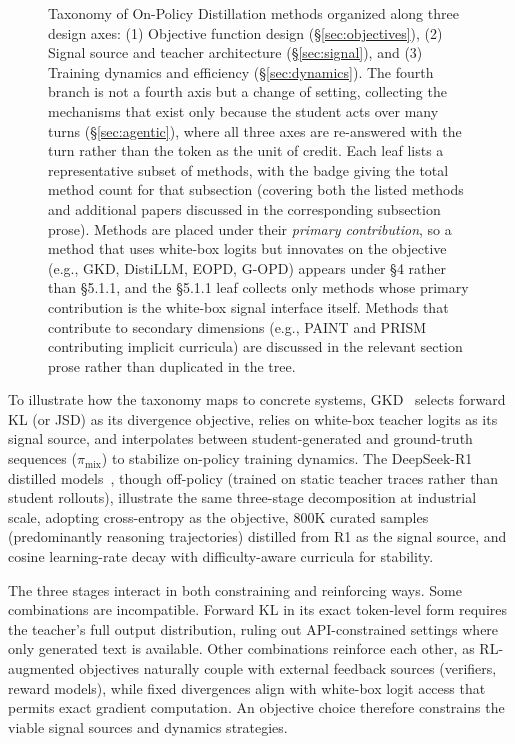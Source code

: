 \documentclass{article} %
\begin{document}
\begin{figure}[!htbp]
\caption{Taxonomy of On-Policy Distillation methods organized along three design axes: (1) Objective function design (\S\ref{sec:objectives}), (2) Signal source and teacher architecture (\S\ref{sec:signal}), and (3) Training dynamics and efficiency (\S\ref{sec:dynamics}). The fourth branch is not a fourth axis but a change of setting, collecting the mechanisms that exist only because the student acts over many turns (\S\ref{sec:agentic}), where all three axes are re-answered with the turn rather than the token as the unit of credit. Each leaf lists a representative subset of methods, with the badge giving the total method count for that subsection (covering both the listed methods and additional papers discussed in the corresponding subsection prose). Methods are placed under their \emph{primary contribution}, so a method that uses white-box logits but innovates on the objective (e.g., GKD, DistiLLM, EOPD, G-OPD) appears under \S 4 rather than \S 5.1.1, and the \S 5.1.1 leaf collects only methods whose primary contribution is the white-box signal interface itself. Methods that contribute to secondary dimensions (e.g., PAINT and PRISM contributing implicit curricula) are discussed in the relevant section prose rather than duplicated in the tree.}
\label{fig:taxonomy}
\end{figure}

To illustrate how the taxonomy maps to concrete systems, GKD~\citep{2306.13649} selects forward KL (or JSD) as its divergence objective, relies on white-box teacher logits as its signal source, and interpolates between student-generated and ground-truth sequences ($\pi_{\mathrm{mix}}$) to stabilize on-policy training dynamics. The DeepSeek-R1 distilled models~\citep{2501.12948}, though off-policy (trained on static teacher traces rather than student rollouts), illustrate the same three-stage decomposition at industrial scale, adopting cross-entropy as the objective, 800K curated samples (predominantly reasoning trajectories) distilled from R1 as the signal source, and cosine learning-rate decay with difficulty-aware curricula for stability.

The three stages interact in both constraining and reinforcing ways. Some combinations are incompatible. Forward KL in its exact token-level form requires the teacher's full output distribution, ruling out API-constrained settings where only generated text is available. Other combinations reinforce each other, as RL-augmented objectives naturally couple with external feedback sources (verifiers, reward models), while fixed divergences align with white-box logit access that permits exact gradient computation. An objective choice therefore constrains the viable signal sources and dynamics strategies.
\end{document}
